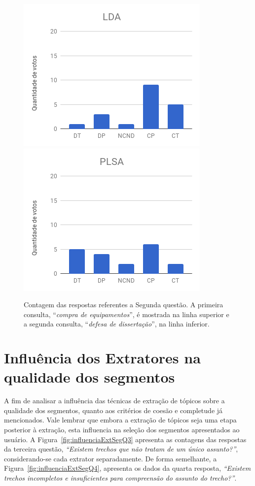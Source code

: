 \begin{figure}[!h]
		\includegraphics[width=.31\textwidth]{conteudo/capitulos/figs/figuras-experimento/C2-Q2-LDA.png}
		\includegraphics[width=.31\textwidth]{conteudo/capitulos/figs/figuras-experimento/C2-Q2-PLSA.png}

	\caption{Contagem das respostas referentes a Segunda questão. A primeira consulta, ``\textit{compra de equipamentos}'', é mostrada na linha superior e a segunda consulta, ``\textit{defesa de dissertação}'', na linha inferior.}
	\label{fig:c12-q2}
\end{figure}








\section{Influência dos Extratores na qualidade dos segmentos}

A fim de analisar a influência das técnicas de extração de tópicos sobre a qualidade dos segmentos, quanto aos critérios de coesão e completude já mencionados. Vale lembrar que embora a extração de tópicos seja uma etapa posterior à extração, esta influencia na seleção dos segmentos apresentados ao usuário. 
A Figura~\ref{fig:influenciaExtSegQ3} apresenta as contagens das respostas da terceira questão, \textit{``Existem trechos que não tratam de um único assunto?''}, considerando-se cada extrator separadamente. De forma semelhante, a Figura~\ref{fig:influenciaExtSegQ4}, apresenta os dados da quarta resposta, \textit{``Existem trechos incompletos e insuficientes para compreensão do assunto do trecho?''}.



